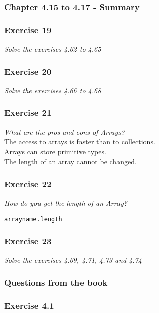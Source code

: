 \subsubsection{Chapter 4.15 to 4.17 - Summary}

\subsubsection*{Exercise 19}
\textit{Solve the exercises 4.62 to 4.65}\\

\subsubsection*{Exercise 20}
\textit{Solve the exercises 4.66 to 4.68}\\

\subsubsection*{Exercise 21}
\textit{What are the pros and cons of Arrays?}\\
The access to arrays is faster than to collections. \\
Arrays can store primitive types. \\
The length of an array cannot be changed. 

\subsubsection*{Exercise 22}
\textit{How do you get the length of an Array?}\\
\begin{lstlisting}
arrayname.length
\end{lstlisting}

\subsubsection*{Exercise 23}
\textit{Solve the exercises 4.69, 4.71, 4.73 and 4.74}\\

\subsubsection{Questions from the book}

\subsubsection{Exercise 4.1}

